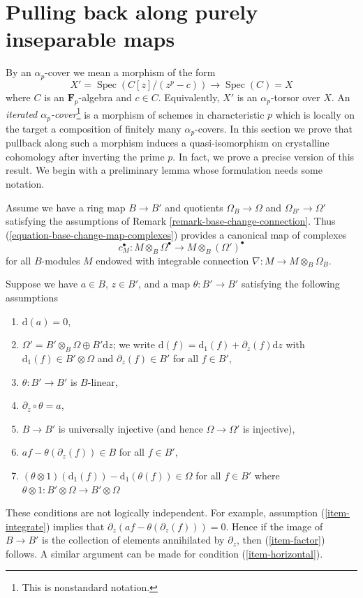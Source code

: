 \documentclass{stacks-project}
\theoremstyle{plain}
\theoremstyle{definition}
\theoremstyle{remark}
\numberwithin{equation}{subsection}
\def\Spec{\mathop{\mathrm{Spec}}}
\begin{document}
\section{Pulling back along purely inseparable maps}
\label{section-pull-back-along-pth-root}

\noindent
By an $\alpha_p$-cover we mean a morphism of the form
$$
X' = \Spec(C[z]/(z^p - c)) \longrightarrow \Spec(C) = X
$$
where $C$ is an $\mathbf{F}_p$-algebra and $c \in C$. Equivalently,
$X'$ is an $\alpha_p$-torsor over $X$. An {\it iterated
$\alpha_p$-cover}\footnote{This is nonstandard notation.}
is a morphism of schemes in characteristic
$p$ which is locally on the target a composition of finitely many
$\alpha_p$-covers. In this section we prove that pullback along
such a morphism induces a quasi-isomorphism on crystalline cohomology
after inverting the prime $p$. In fact, we prove a precise version
of this result. We begin with a preliminary lemma whose formulation
needs some notation.

\medskip\noindent
Assume we have a ring map $B \to B'$ and quotients $\Omega_B \to \Omega$ and
$\Omega_{B'} \to \Omega'$ satisfying the assumptions of
Remark \ref{remark-base-change-connection}.
Thus (\ref{equation-base-change-map-complexes}) provides a
canonical map of complexes
$$
c_M^\bullet :
M \otimes_B \Omega^\bullet
\longrightarrow
M \otimes_B (\Omega')^\bullet
$$
for all $B$-modules $M$ endowed with integrable connection
$\nabla : M \to M \otimes_B \Omega_B$.

\medskip\noindent
Suppose we have $a \in B$, $z \in B'$, and a map $\theta : B' \to B'$
satisfying the following assumptions
\begin{enumerate}
\item
\label{item-d-a-zero}
$\text{d}(a) = 0$,
\item
\label{item-direct-sum}
$\Omega' = B' \otimes_B \Omega \oplus B'\text{d}z$; we write
$\text{d}(f) = \text{d}_1(f) + \partial_z(f) \text{d}z$
with $\text{d}_1(f) \in B' \otimes \Omega$ and $\partial_z(f) \in B'$
for all $f \in B'$,
\item
\label{item-theta-linear}
$\theta : B' \to B'$ is $B$-linear,
\item
\label{item-integrate}
$\partial_z \circ \theta = a$,
\item
\label{item-injective}
$B \to B'$ is universally injective (and hence $\Omega \to \Omega'$
is injective),
\item
\label{item-factor}
$af - \theta(\partial_z(f)) \in B$ for all $f \in B'$,
\item
\label{item-horizontal}
$(\theta \otimes 1)(\text{d}_1(f)) - \text{d}_1(\theta(f)) \in \Omega$
for all $f \in B'$ where
$\theta \otimes 1 : B' \otimes \Omega \to B' \otimes \Omega$
\end{enumerate}
These conditions are not logically independent.
For example, assumption (\ref{item-integrate}) implies
that $\partial_z(af - \theta(\partial_z(f))) = 0$.
Hence if the image of $B \to B'$ is the collection of
elements annihilated by $\partial_z$, then (\ref{item-factor})
follows. A similar argument can be made for condition (\ref{item-horizontal}).
\end{document}
